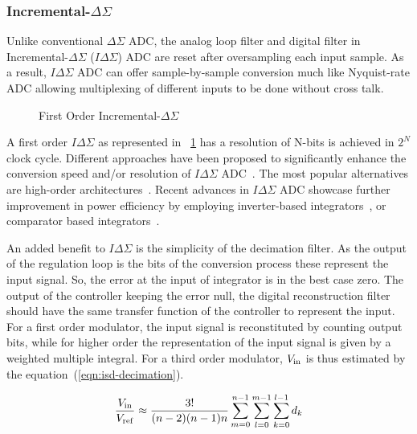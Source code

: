 \subsubsection{Incremental-\(\Delta\Sigma \)}
\label{sec:soa-isd}
Unlike conventional \(\Delta\Sigma \) ADC, the analog loop filter and digital filter in Incremental-\(\Delta\Sigma \) (\(I\Delta\Sigma \)) ADC are reset after oversampling each input sample. As a result, \(I\Delta\Sigma \) ADC can offer sample-by-sample conversion much like Nyquist-rate ADC allowing multiplexing of different inputs to be done without cross talk.

\begin{figure}[htp]
	\centering
	\resizebox{\textwidth}{!} {}
	\caption{First Order Incremental-\(\Delta\Sigma \)}
	\label{fig:isd_first_order_principle}
\end{figure}

A first order \(I\Delta\Sigma \) as represented in \figurename~\ref{fig:isd_first_order_principle} has a resolution of N-bits is achieved in \(2^N \) clock cycle. Different approaches have been proposed to significantly enhance the conversion speed and/or resolution of \(I\Delta\Sigma \) ADC~\cite{Markus2004,Quiquempoix2006,Caldwell2010}. The most popular alternatives are high-order architectures~\cite{Au1997,Babanezhad1991,Baird1996}. Recent advances in \(I\Delta\Sigma \) ADC showcase further improvement in power efficiency by employing inverter-based integrators~\cite{Chae2009}, or comparator based integrators~\cite{Yamamoto2012}.

An added benefit to \(I\Delta\Sigma \) is the simplicity of the decimation filter. As the output of the regulation loop is the bits of the conversion process these represent the input signal. So, the error at the input of integrator is in the best case zero. The output of the controller keeping the error null, the digital reconstruction filter should have the same transfer function of the controller to represent the input. For a first order modulator, the input signal is reconstituted by counting output bits, while for higher order the representation of the input signal is given by a weighted multiple integral. For a third order modulator, \(V_{\rm in}\) is thus estimated by the equation~(\ref{eqn:isd-decimation}).

\begin{equation}
	\frac{V_{\rm in}}{V_{\rm ref}}\approx \frac{3!}{(n-2)(n-1)n}\sum_{m=0}^{n-1}\sum_{l=0}^{m-1}\sum_{k=0}^{l-1}d_{k}
\label{eqn:isd-decimation}
\end{equation}

